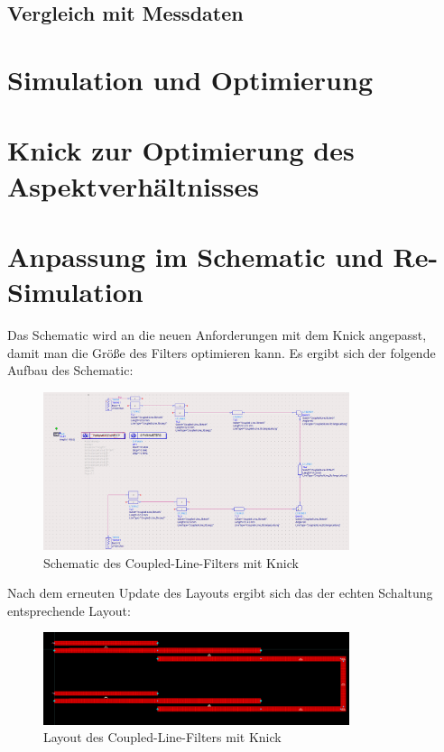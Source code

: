     \subsection{Vergleich mit Messdaten}

\section{Simulation und Optimierung}
    

\section{Knick zur Optimierung des Aspektverhältnisses}

\section{Anpassung im Schematic und Re-Simulation}
    Das Schematic wird an die neuen Anforderungen mit dem Knick angepasst, damit man die Größe des Filters optimieren kann. Es ergibt sich der folgende Aufbau des Schematic:
    \begin{figure}[H]
        \centering
        \includegraphics[width=0.8\textwidth]{Pictures/SchematicMitKnick.png}
        \caption{Schematic des Coupled-Line-Filters mit Knick}
    \end{figure}
    Nach dem erneuten Update des Layouts ergibt sich das der echten Schaltung entsprechende Layout:
    \begin{figure}[H]
        \centering
        \includegraphics[width=0.8\textwidth]{Pictures/LayoutmitKnick.png}
        \caption{Layout des Coupled-Line-Filters mit Knick}
    \end{figure}
